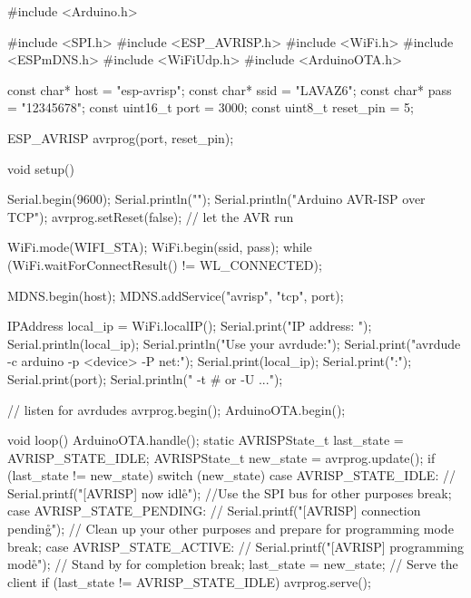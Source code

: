 #include <Arduino.h>

#include <SPI.h>
#include <ESP_AVRISP.h>
#include <WiFi.h>
#include <ESPmDNS.h>
#include <WiFiUdp.h>
#include <ArduinoOTA.h>

const char* host = "esp-avrisp";
const char* ssid = "LAVAZ6";
const char* pass = "12345678";
const uint16_t port = 3000;
const uint8_t reset_pin = 5;

ESP_AVRISP avrprog(port, reset_pin);

void setup() {
     Serial.begin(9600);
     Serial.println("");
    Serial.println("Arduino AVR-ISP over TCP");
    avrprog.setReset(false); // let the AVR run

    WiFi.mode(WIFI_STA);
    WiFi.begin(ssid, pass);
    while (WiFi.waitForConnectResult() != WL_CONNECTED);

    MDNS.begin(host);
    MDNS.addService("avrisp", "tcp", port);

    IPAddress local_ip = WiFi.localIP();
     Serial.print("IP address: ");
     Serial.println(local_ip);
     Serial.println("Use your avrdude:");
     Serial.print("avrdude -c arduino -p <device> -P net:");
     Serial.print(local_ip);
     Serial.print(":");
     Serial.print(port);
     Serial.println(" -t # or -U ...");

    // listen for avrdudes
    avrprog.begin();
    ArduinoOTA.begin();
}

void loop() {
    ArduinoOTA.handle();
    static AVRISPState_t last_state = AVRISP_STATE_IDLE;
    AVRISPState_t new_state = avrprog.update();
    if (last_state != new_state) {
        switch (new_state) {
            case AVRISP_STATE_IDLE: {
                // Serial.printf("[AVRISP] now idle\r\n");
                 //Use the SPI bus for other purposes
                break;
            }
            case AVRISP_STATE_PENDING: {
                // Serial.printf("[AVRISP] connection pending\r\n");
                // Clean up your other purposes and prepare for programming mode
                break;
            }
            case AVRISP_STATE_ACTIVE: {
                // Serial.printf("[AVRISP] programming mode\r\n");
                // Stand by for completion
                break;
            }
        }
        last_state = new_state;
    }
    // Serve the client
    if (last_state != AVRISP_STATE_IDLE) {
        avrprog.serve();
    }
}
